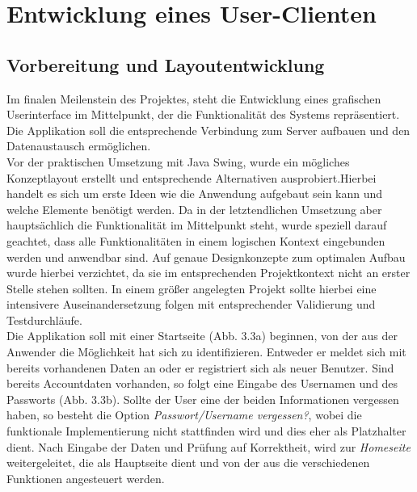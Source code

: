 

\section{Entwicklung eines User-Clienten}

\subsection{Vorbereitung und Layoutentwicklung}
Im finalen Meilenstein des Projektes, steht die Entwicklung eines grafischen Userinterface im Mittelpunkt, der die Funktionalität des Systems repräsentiert. Die Applikation soll die entsprechende Verbindung zum Server aufbauen und den Datenaustausch ermöglichen. \\

Vor der praktischen Umsetzung mit Java Swing, wurde ein mögliches Konzeptlayout erstellt und entsprechende Alternativen ausprobiert.Hierbei handelt es sich um erste Ideen wie die Anwendung aufgebaut sein kann und welche Elemente benötigt werden.
Da in der letztendlichen Umsetzung aber hauptsächlich die Funktionalität im Mittelpunkt steht, wurde speziell darauf geachtet, dass alle Funktionalitäten in einem logischen Kontext eingebunden werden und anwendbar sind. Auf genaue Designkonzepte zum optimalen Aufbau wurde hierbei verzichtet, da sie im entsprechenden Projektkontext nicht an erster Stelle stehen sollten. In einem größer angelegten Projekt sollte hierbei eine intensivere Auseinandersetzung folgen mit entsprechender Validierung und Testdurchläufe. \\

Die Applikation soll mit einer Startseite (Abb. 3.3a) beginnen, von der aus der Anwender die Möglichkeit hat sich zu identifizieren. Entweder er meldet sich mit bereits vorhandenen Daten an oder er registriert sich als neuer Benutzer.
Sind bereits Accountdaten vorhanden, so folgt eine Eingabe des Usernamen und des Passworts (Abb. 3.3b). Sollte der User eine der beiden Informationen vergessen haben, so besteht die Option \textit{Passwort/Username vergessen?}, wobei die funktionale Implementierung nicht stattfinden wird und dies eher als Platzhalter dient. Nach Eingabe der Daten und Prüfung auf Korrektheit, wird zur \textit{Homeseite} weitergeleitet, die als Hauptseite dient und von der aus die verschiedenen Funktionen angesteuert werden.

